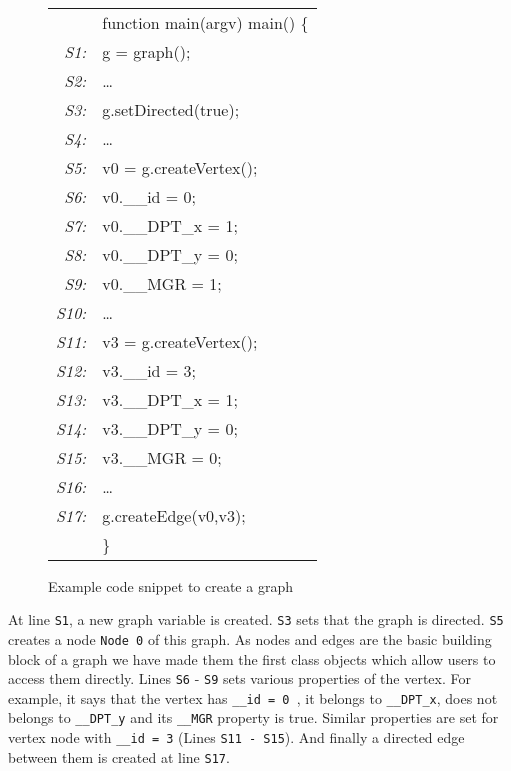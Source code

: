 \begin{example}
{\begin{figure}
\begin{center}
      {\small \tt
        \begin{tabular}[b]{rl}
          &function main(argv) main() \{ \\
          {\em \scriptsize S1:}& \quad g = graph(); \\
          {\em \scriptsize S2:}& \quad \ldots        \\
          {\em \scriptsize S3:}& \quad g.setDirected(true); \\
          {\em \scriptsize S4:}& \quad \ldots \\ {\em \scriptsize S5:}& \quad v0  
          = g.createVertex(); \\
          {\em \scriptsize S6:}& \quad v0.\_\_id     = 0; \\
          {\em \scriptsize S7:}& \quad v0.\_\_DPT\_x  = 1; \\
          {\em \scriptsize S8:}& \quad v0.\_\_DPT\_y  = 0; \\
          {\em \scriptsize S9:}& \quad v0.\_\_MGR    = 1; \\
          {\em \scriptsize S10:}& \quad \ldots \\ {\em \scriptsize S11:}& \quad 
          v3  = g.createVertex(); \\
          {\em \scriptsize S12:}& \quad v3.\_\_id     = 3; \\
          {\em \scriptsize S13:}& \quad v3.\_\_DPT\_x  = 1; \\
          {\em \scriptsize S14:}& \quad v3.\_\_DPT\_y  = 0; \\
          {\em \scriptsize S15:}& \quad v3.\_\_MGR    = 0; \\
          {\em \scriptsize S16:}& \quad \ldots \\ {\em \scriptsize S17:}& \quad 
          g.createEdge(v0,v3); \\
          &\}
        \end{tabular}
      }
\end{center}
  \caption{Example code snippet to create a graph}
  \label{fig:motiv_2}
\end{figure}
  
  
  
  At line {\tt S1}, a new graph variable is created. {\tt S3} sets that
  the graph is directed. {\tt S5} creates a node {\tt Node 0} of this graph. As 
  nodes and edges are the basic building block of a graph we have made them the 
  first class objects which allow users to access them directly. Lines {\tt S6} 
  - {\tt S9} sets various properties of the vertex. For example, it says that 
    the vertex has {\tt \_\_id = 0 }, it belongs to  {\tt \_\_DPT\_x}, does not 
    belongs to {\tt \_\_DPT\_y} and its {\tt \_\_MGR} property is true. Similar 
    properties are set for vertex node with {\tt \_\_id = 3} (Lines {\tt S11 - 
        S15}).
  And finally a directed  edge between them is created at line {\tt S17}. 

}
\end{example}
